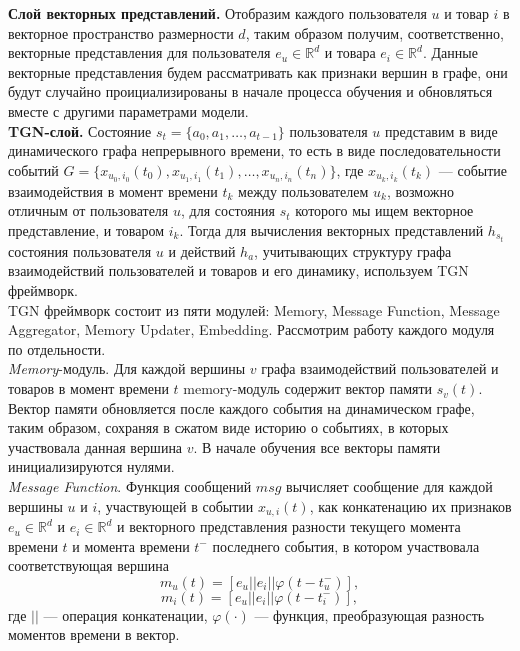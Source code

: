\documentclass[a4paper,14pt,oneside]{mipt-thesis-ms}
\renewcommand{\phi}{\varphi}  %
\begin{document}
{\bf Слой векторных представлений.} Отобразим каждого пользователя $u$ и товар $i$ в векторное пространство размерности $d$, таким образом получим, соответственно, векторные представления для пользователя $e_u \in \mathbb{R}^d$ и товара $e_i \in \mathbb{R}^d$. Данные векторные представления будем рассматривать как признаки вершин в графе, они будут случайно проициализированы в начале процесса обучения и обновляться вместе с другими параметрами модели.\\

{\bf TGN-слой.} Состояние $s_t = \{a_0, a_1, \dots, a_{t-1}\}$ пользователя $u$ представим в виде динамического графа непрерывного времени, то есть в виде последовательности событий $G = \{x_{u_0, i_0}(t_0), x_{u_1, i_1}(t_1), \dots, x_{u_n, i_n}(t_n)\}$, где $x_{u_k, i_k}(t_{k})$ --- событие взаимодействия в момент времени $t_k$ между пользователем $u_k$, возможно отличным от пользователя $u$, для состояния $s_t$ которого мы ищем векторное представление, и товаром $i_k$. Тогда для вычисления векторных представлений $h_{s_t}$ состояния пользователя $u$ и действий $h_a$, учитывающих структуру графа взаимодействий пользователей и товаров и его динамику, используем TGN фреймворк.\\

TGN фреймворк состоит из пяти модулей: Memory, Message Function, Message Aggregator, Memory Updater, Embedding. Рассмотрим работу каждого модуля по отдельности.\\

{\it Memory}-модуль. Для каждой вершины $v$ графа взаимодействий пользователей и товаров в момент времени $t$ memory-модуль содержит вектор памяти $s_{v}(t)$. Вектор памяти обновляется после каждого события на динамическом графе, таким образом, сохраняя в сжатом виде историю о событиях, в которых участвовала данная вершина $v$. В начале обучения все векторы памяти инициализируются нулями.\\

{\it Message Function}. Функция сообщений ${msg}$ вычисляет сообщение для каждой вершины $u$ и $i$, участвующей в событии $x_{u, i}(t)$, как конкатенацию их признаков $e_u \in \mathbb{R}^d$ и $e_i \in \mathbb{R}^d$ и векторного представления разности текущего момента времени $t$ и момента времени $t^-$ последнего события, в котором участвовала соответствующая вершина 
$$m_u(t) = [e_u || e_i || \phi(t - t^-_u)],$$
$$m_i(t) = [e_u || e_i || \phi(t - t^-_i)],$$
где $||$ --- операция конкатенации, $\phi(\cdot)$ --- функция, преобразующая разность моментов времени в вектор.\\
\end{document}
